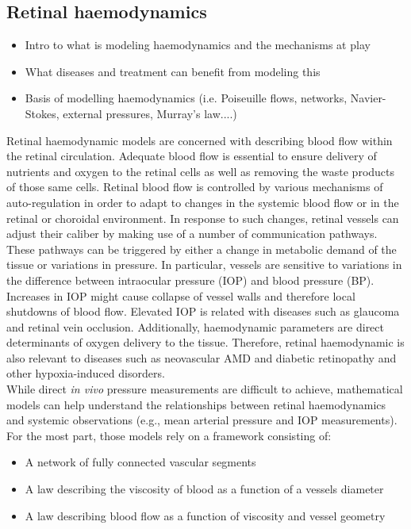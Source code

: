\documentclass[12pt,a4paper]{article}
\begin{document}
\subsection{Retinal haemodynamics}
\begin{itemize}
\item Intro to what is modeling haemodynamics and the mechanisms at play
\item What diseases and treatment can benefit from modeling this
\item Basis of modelling haemodynamics (i.e. Poiseuille flows, networks, Navier-Stokes, external pressures, Murray's law....)
\end{itemize}
Retinal haemodynamic models are concerned with describing blood flow within the retinal circulation.
Adequate blood flow is essential to ensure delivery of nutrients and oxygen to the retinal cells as well as removing the waste products of those same cells.
Retinal blood flow is controlled by various mechanisms of auto-regulation in order to adapt to changes in the systemic blood flow or in the retinal or choroidal environment.
In response to such changes, retinal vessels can adjust their caliber by making use of a number of communication pathways.
These pathways can be triggered by either a change in metabolic demand of the tissue or variations in pressure.
In particular, vessels are sensitive to variations in the difference between intraocular pressure (IOP) and blood pressure (BP).
Increases in IOP might cause collapse of vessel walls and therefore local shutdowns of blood flow.
Elevated IOP is related with diseases such as glaucoma and retinal vein occlusion. 
Additionally, haemodynamic parameters are direct determinants of oxygen delivery to the tissue.
Therefore, retinal haemodynamic is also relevant to diseases such as neovascular AMD and diabetic retinopathy and other hypoxia-induced disorders. \\
While direct \textit{in vivo} pressure measurements are difficult to achieve, mathematical models can help understand the relationships between retinal haemodynamics and systemic observations (e.g., mean arterial pressure and IOP measurements).
For the most part, those models rely on a framework consisting of:
\begin{itemize}
\item A network of fully connected vascular segments
\item A law describing the viscosity of blood as a function of a vessels diameter
\item A law describing blood flow as a function of viscosity and vessel geometry
\end{itemize}
\end{document}
